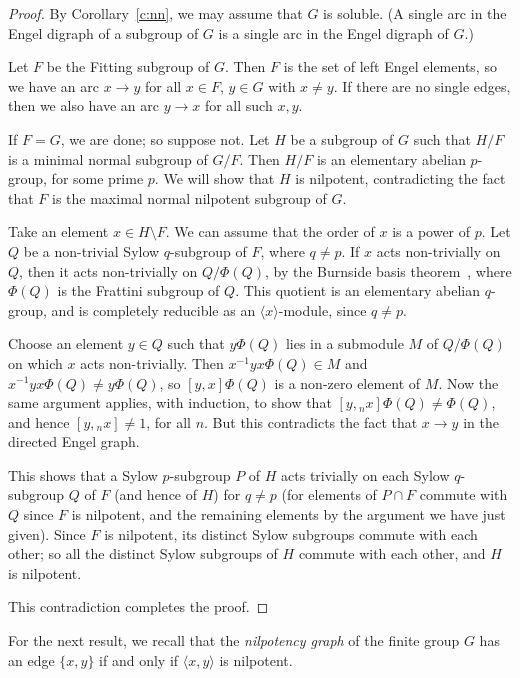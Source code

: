 \documentclass[reqno,12pt]{amsart}
\theoremstyle{plain}
\theoremstyle{definition}
\begin{document}
\begin{proof}
By Corollary~\ref{c:nn}, we may assume that $G$ is soluble. (A single arc in
the Engel digraph of a subgroup of $G$ is a single arc in the Engel digraph 
of $G$.)

Let $F$ be the Fitting subgroup of $G$. Then $F$ is the set of left Engel
elements, so we have an arc $x\to y$ for all $x\in F$, $y\in G$ with $x\ne y$.
If there are no single edges, then we also have an arc $y\to x$ for all such
$x,y$.

If $F=G$, we are done; so suppose not. Let $H$ be a subgroup of $G$ such that
$H/F$ is a minimal normal subgroup of $G/F$. Then $H/F$ is an elementary
abelian $p$-group, for some prime $p$. We will show that $H$ is nilpotent,
contradicting the fact that $F$ is the maximal normal nilpotent subgroup of $G$.

Take an element $x\in H\setminus F$. We can assume that the order of $x$ is
a power of $p$. Let $Q$ be a non-trivial Sylow $q$-subgroup of $F$, where
$q\ne p$. If $x$ acts non-trivially on $Q$, then it acts non-trivially on
$Q/\Phi(Q)$, by the Burnside basis theorem~\cite[Chapter 10]{hall}, where
$\Phi(Q)$ is the Frattini subgroup of $Q$. This quotient is an elementary
abelian $q$-group, and is completely reducible as an $\langle x\rangle$-module,
since $q\ne p$.

Choose an element $y\in Q$ such that $y\Phi(Q)$ lies in a submodule
$M$ of $Q/\Phi(Q)$ on which $x$ acts non-trivially. Then $x^{-1}yx\Phi(Q)\in M$
and $x^{-1}yx\Phi(Q)\ne y\Phi(Q)$, so $[y,x]\Phi(Q)$ is a non-zero element of
$M$. Now the same argument applies, with induction, to show that
$[y,{}_nx]\Phi(Q)\ne\Phi(Q)$, and hence $[y,{}_nx]\ne1$, for all $n$. But this
contradicts the fact that $x\to y$ in the directed Engel graph.

This shows that a Sylow $p$-subgroup $P$ of $H$ acts trivially on each Sylow
$q$-subgroup $Q$ of $F$ (and hence of $H$) for $q\ne p$ (for elements of
$P\cap F$ commute with $Q$ since $F$ is nilpotent, and the remaining elements
by the argument we have just given). Since $F$ is nilpotent,
its distinct Sylow subgroups commute with each other; so all the distinct
Sylow subgroups of $H$ commute with each other, and $H$ is nilpotent.

This contradiction completes the proof.
\end{proof}

For the next result, we recall that the \emph{nilpotency graph} of the finite
group $G$ has an edge $\{x,y\}$ if and only if $\langle x,y\rangle$ is
nilpotent.
\end{document}
